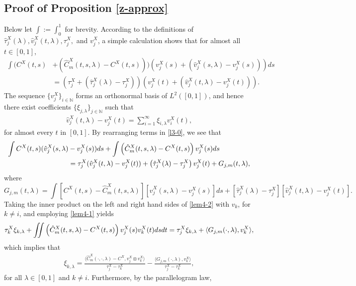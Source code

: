 \documentclass[11pt]{article}
\numberwithin{equation}{section}
\numberwithin{theorem}{section}
\numberwithin{lemma}{section}
\numberwithin{proposition}{section}
\numberwithin{cor}{section}
\numberwithin{definition}{section}
\numberwithin{cons}{section}
\numberwithin{rem}{section}
\numberwithin{exa}{section}
\numberwithin{table}{section}
\numberwithin{figure}{section}
\numberwithin{algo}{section}
\newcommand{\intt}{\int\hspace{-.2cm}\int}
\begin{document}
{{\subsection{Proof of Proposition \ref{z-approx}} \label{appendix1}
Below let $\int:= \int_{0}^{1}$ for brevity. According to the definitions of $\hat{\tau}^X_j(\lambda), \hat{v}^X_j(t,\lambda),\tau^X_j,$ and $v^X_j$, a simple calculation shows that for almost all $t\in[0,1]$,
\begin{align}\label{l3-0}
\int (C^X(t,s) & + (\hat{C}_m^X(t,s,\lambda) - C^X(t,s) ) )(v^X_j(s)+ (\hat{v}^X_j(s,\lambda)-v^X_j(s)))ds \\ \nonumber
&= (\tau^X_j  + (\hat{\tau}^X_j(\lambda)-\tau^X_j))(v^X_j(t)+ (\hat{v}^X_j(t,\lambda)-v^X_j(t))).
\end{align}
The sequence $\{v^X_j\}_{i\in\mathbb{N}}$ forms an orthonormal basis of $L^2([0,1])$, and hence there exist coefficients $\{\xi_{j,\lambda}\}_ {j\in\mathbb{N}}$ such that
\begin{align}\label{lem4-1}
\hat{v}^X_j(t,\lambda) - v^X_j(t) = \sum_{i=1}^\infty \xi_{i,\lambda}v^X_i(t),
\end{align}
for almost every $t$ in $[0,1]$. By rearranging terms in \eqref{l3-0}, we see that
\begin{align}\label{lem4-2}
\int C^X(t,s)(\hat{v}^X_j(s,\lambda) & - v^X_j(s))ds + \int \left( \hat{C}_m^X(t,s,\lambda) -  C^X(t,s)\right)v^X_j(s)ds \\
&= \tau^X_j (\hat{v}^X_j(t,\lambda)- v^X_j(t)) + \left(\hat{\tau}^X_j(\lambda) - \tau^X_j\right)v^X_j(t)+ G_{j,m}(t,\lambda), \notag
\end{align}
where
$$
G_{j,m}(t,\lambda)= \int  [C^X(t,s) - \hat{C}_m^X(t,s,\lambda)] [ \hat{v}^X_j(s,\lambda)-v^X_j(s)]ds +[\hat{\tau}^X_j(\lambda)-\tau^X_j][\hat{v}^X_j(t,\lambda)-v^X_j(t)].
$$
Taking the inner product on the left and right hand sides of \eqref{lem4-2} with $v_k$, for $k\ne i$, and employing \eqref{lem4-1} yields
$$
 \tau^X_k \xi_{k,\lambda}  + \intt \left( \hat{C}_m^X(t,s,\lambda) -  C^X(t,s)\right)v^X_j(s)v^X_k(t)dsdt= \tau^X_j \xi_{k,\lambda}+ \langle G_{j,m}(\cdot,\lambda),v^X_k \rangle,
$$
which implies that
\begin{align}\label{lem4-3}
\xi_{k,\lambda} =  \frac{\langle  \hat{C}_m^X(\cdot,\cdot,\lambda)-  C^X, v^X_j \otimes v^X_k \rangle }{\tau^X_j - \tau^X_k}- \frac{\langle G_{j,m}(\cdot,\lambda),v^X_k \rangle}{\tau^X_j - \tau^X_k},
\end{align}
for all ${\lambda \in [0,1]}$ and $k \ne i$. Furthermore, by the parallelogram law,
}}
\end{document}
